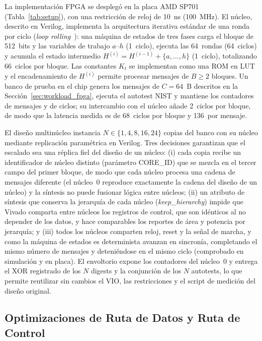\documentclass[conference]{IEEEtran}
\begin{document}
La implementación FPGA se desplegó en la placa AMD SP701 (Tabla~\ref{tab:setup}), con una restricción de reloj de 10~ns (100~MHz). El núcleo, descrito en Verilog, implementa la arquitectura iterativa estándar de una ronda por ciclo (\textit{loop rolling}~\cite{martino2020}): una máquina de estados de tres fases carga el bloque de 512~bits y las variables de trabajo $a$--$h$ (1~ciclo), ejecuta las 64~rondas (64~ciclos) y acumula el estado intermedio $H^{(i)} = H^{(i-1)} + \{a,\dots,h\}$ (1~ciclo), totalizando 66~ciclos por bloque. Las constantes $K_t$ se implementan como una ROM en LUT y el encadenamiento de $H^{(i)}$ permite procesar mensajes de $B \geq 2$ bloques. Un banco de prueba en el chip genera los mensajes de $C=64$~B descritos en la Sección~\ref{sec:workload_fpga}, ejecuta el autotest NIST y mantiene los contadores de mensajes y de ciclos; su intercambio con el núcleo añade 2~ciclos por bloque, de modo que la latencia medida es de 68~ciclos por bloque y 136~por mensaje.

El diseño multinúcleo instancia $N \in \{1, 4, 8, 16, 24\}$ copias del banco con su núcleo mediante replicación paramétrica en Verilog. Tres decisiones garantizan que el escalado sea una réplica fiel del diseño de un núcleo: (i) cada copia recibe un identificador de núcleo distinto (parámetro CORE\_ID) que se mezcla en el tercer campo del primer bloque, de modo que cada núcleo procesa una cadena de mensajes diferente (el núcleo~0 reproduce exactamente la cadena del diseño de un núcleo) y la síntesis no puede fusionar lógica entre núcleos; (ii) un atributo de síntesis que conserva la jerarquía de cada núcleo (\textit{keep\_hierarchy}) impide que Vivado comparta entre núcleos los registros de control, que son idénticos al no depender de los datos, y hace comparables los reportes de área y potencia por jerarquía; y (iii) todos los núcleos comparten reloj, reset y la señal de marcha, y como la máquina de estados es determinista avanzan en sincronía, completando el mismo número de mensajes y deteniéndose en el mismo ciclo (comprobado en simulación y en placa). El envoltorio expone los contadores del núcleo~0 y entrega el XOR registrado de los $N$ digests y la conjunción de los $N$ autotests, lo que permite reutilizar sin cambios el VIO, las restricciones y el script de medición del diseño original.

\subsection{Optimizaciones de Ruta de Datos y Ruta de Control}
\label{sec:fpga_opt}
\end{document}
